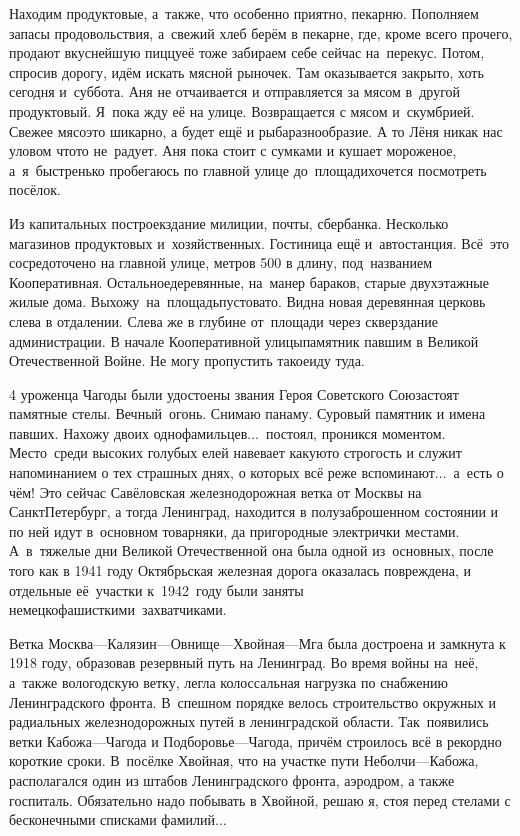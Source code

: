 Находим продуктовые, а~также, что особенно приятно, пекарню. Пополняем запасы продовольствия, а~свежий хлеб берём в пекарне, где, кроме всего прочего, продают вкуснейшую пиццу\mdash её тоже забираем себе сейчас на~перекус. Потом, спросив дорогу, идём искать мясной рыночек. Там оказывается закрыто, хоть сегодня и~суббота. Аня не отчаивается и отправляется за мясом в~другой продуктовый. Я~пока жду её на улице. Возвращается с мясом и~скумбрией. Свежее мясо\mdash это шикарно, а будет ещё и рыба\mdash разнообразие. А то Лёня никак нас уловом что\sdash то не~радует. Аня пока стоит с сумками и кушает мороженое, а~я~быстренько пробегаюсь по главной улице до~площади\mdash хочется посмотреть посёлок.

Из капитальных построек\mdash здание милиции, почты, сбербанка. Несколько магазинов продуктовых и~хозяйственных. Гостиница ещё и~автостанция. Всё~это сосредоточено на главной улице, метров 500 в длину, под~названием Кооперативная. Остальное\mdash деревянные, на~манер бараков, старые двухэтажные жилые дома. Выхожу~на~площадь\mdash пустовато. Видна новая деревянная церковь слева в отдалении. Слева же в глубине от~площади через сквер\mdash здание администрации. В начале Кооперативной улицы\mdash памятник павшим в Великой Отечественной Войне. Не могу пропустить такое\mdash иду туда. 

4 уроженца Чагоды были удостоены звания Героя Советского Союза\mdash стоят памятные стелы. Вечный~огонь. Снимаю панаму. Суровый памятник и имена павших. Нахожу двоих однофамильцев$\ldots$~постоял, проникся моментом. Место~среди высоких голубых елей навевает какую\sdash то строгость и служит напоминанием о тех страшных днях, о которых всё реже вспоминают$\ldots$~а~есть о чём! Это сейчас Савёловская железнодорожная ветка от Москвы на Санкт\sdash Петербург, а тогда Ленинград, находится в полузаброшенном состоянии и по ней идут в~основном товарняки, да пригородные электрички местами. А~в~тяжелые дни Великой Отечественной она была одной из~основных, после того как в 1941 году Октябрьская железная дорога оказалась повреждена, и отдельные её~участки к~1942~году были заняты немецко\sdash фашисткими~захватчиками.

Ветка Москва\thinspace\nobreakdash---\thinspace Калязин\thinspace\nobreakdash---\thinspace Овнище\thinspace\nobreakdash---\thinspace Хвойная\thinspace\nobreakdash---\thinspace Мга была достроена и замкнута к 1918 году, образовав резервный путь на Ленинград. Во время войны на~неё, а~также вологодскую ветку, легла колоссальная нагрузка по снабжению Ленинградского фронта. В~спешном порядке велось строительство окружных и радиальных железнодорожных путей в ленинградской области. Так~появились ветки Кабожа\thinspace\nobreakdash---\thinspace Чагода и Подборовье\thinspace\nobreakdash---\thinspace Чагода, причём строилось всё в рекордно короткие сроки. В~посёлке Хвойная, что на участке пути Неболчи\thinspace\nobreakdash---\thinspace Кабожа, располагался один из штабов Ленинградского фронта, аэродром, а также госпиталь. Обязательно надо побывать в Хвойной, решаю я, стоя перед стелами с бесконечными списками фамилий$\ldots$

